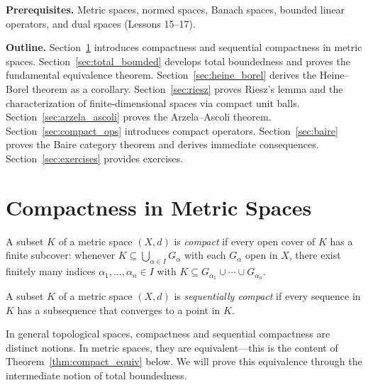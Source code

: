 \documentclass[11pt,a4paper]{article}
\begin{document}
\medskip
\noindent\textbf{Prerequisites.} Metric spaces, normed spaces, Banach
spaces, bounded linear operators, and dual spaces (Lessons 15--17).

\medskip
\noindent\textbf{Outline.}
Section~\ref{sec:compactness} introduces compactness and sequential
compactness in metric spaces.
Section~\ref{sec:total_bounded} develops total boundedness and proves the
fundamental equivalence theorem.
Section~\ref{sec:heine_borel} derives the Heine--Borel theorem as a
corollary.
Section~\ref{sec:riesz} proves Riesz's lemma and the characterization of
finite-dimensional spaces via compact unit balls.
Section~\ref{sec:arzela_ascoli} proves the Arzela--Ascoli theorem.
Section~\ref{sec:compact_ops} introduces compact operators.
Section~\ref{sec:baire} proves the Baire category theorem and derives
immediate consequences.
Section~\ref{sec:exercises} provides exercises.


\section{Compactness in Metric Spaces}
\label{sec:compactness}

\begin{definition}
\label{def:compact}
A subset $K$ of a metric space $(X,d)$ is \emph{compact} if every open cover
of $K$ has a finite subcover: whenever $K \subseteq \bigcup_{\alpha \in I}
G_\alpha$ with each $G_\alpha$ open in $X$, there exist finitely many indices
$\alpha_1, \ldots, \alpha_n \in I$ with
$K \subseteq G_{\alpha_1} \cup \cdots \cup G_{\alpha_n}$.
\end{definition}

\begin{definition}
\label{def:seq_compact}
A subset $K$ of a metric space $(X,d)$ is \emph{sequentially compact} if
every sequence in $K$ has a subsequence that converges to a point in $K$.
\end{definition}

\begin{remark}
\label{rem:compact_vs_seq}
In general topological spaces, compactness and sequential compactness are
distinct notions. In metric spaces, they are equivalent---this is the content
of Theorem~\ref{thm:compact_equiv} below. We will prove this equivalence
through the intermediate notion of total boundedness.
\end{remark}
\end{document}
